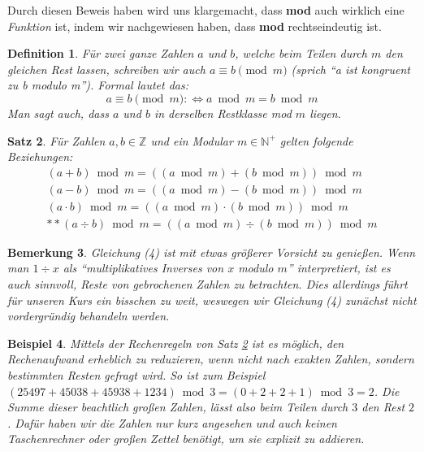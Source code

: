 \documentclass[a4paper]{article}
\newtheorem{satz}{Satz}[section] %
\newtheorem{beispiel}[satz]{Beispiel}
\newtheorem{bemerkung}[satz]{Bemerkung}
\newtheorem{definition}[satz]{Definition} %
\theoremstyle{nonumberplain}
\begin{document}
Durch diesen Beweis haben wird uns klargemacht, dass \textbf{mod} auch wirklich eine \textit{Funktion} ist, indem wir nachgewiesen haben, dass \textbf{mod} rechtseindeutig ist.

\begin{definition}
Für zwei ganze Zahlen $a$ und $b$, welche beim Teilen durch $m$ den gleichen Rest lassen, schreiben wir auch $a \equiv b \pmod{m}$ (sprich "`a ist kongruent zu b modulo m"'). Formal lautet das:
\[
a \equiv b \pmod{m} :\Leftrightarrow a \bmod m = b \bmod m
\]
Man sagt auch, dass $a$ und $b$ in derselben Restklasse mod $m$ liegen.
\end{definition}

\begin{satz}\label{s:mod}
Für Zahlen $a,b \in \mathbb{Z}$ und ein Modular $m \in \mathbb{N}^+$ gelten folgende Beziehungen:\\
\begin{align}
(a + b) \bmod m = ((a \bmod m) + (b \bmod m)) \bmod m\\
(a - b) \bmod m = ((a \bmod m) - (b \bmod m)) \bmod m\\
(a \cdot b) \bmod m = ((a \bmod m) \cdot (b \bmod m)) \bmod m\\
**(a \div b) \bmod m = ((a \bmod m) \div (b \bmod m)) \bmod m
\end{align}
\end{satz}

\begin{bemerkung}
Gleichung (4) ist mit etwas größerer Vorsicht zu genießen. Wenn man $1 \div x$ als "`multiplikatives Inverses von $x$ modulo $m$"' interpretiert, ist es auch sinnvoll, Reste von gebrochenen Zahlen zu betrachten. Dies allerdings führt für unseren Kurs ein bisschen zu weit, weswegen wir Gleichung (4) zunächst nicht vordergründig behandeln werden.
\end{bemerkung}

\begin{beispiel}
Mittels der Rechenregeln von Satz \ref{s:mod} ist es möglich, den Rechenaufwand erheblich zu reduzieren, wenn nicht nach exakten Zahlen, sondern bestimmten Resten gefragt wird. So ist zum Beispiel $(25497 + 45038 + 45938 + 1234) \bmod 3 = (0 + 2 + 2 + 1) \bmod 3 = 2$. Die Summe dieser beachtlich großen Zahlen, lässt also beim Teilen durch $3$ den Rest $2$. Dafür haben wir die Zahlen nur kurz angesehen und auch keinen Taschenrechner oder großen Zettel benötigt, um sie explizit zu addieren.
\end{beispiel}
\end{document}
